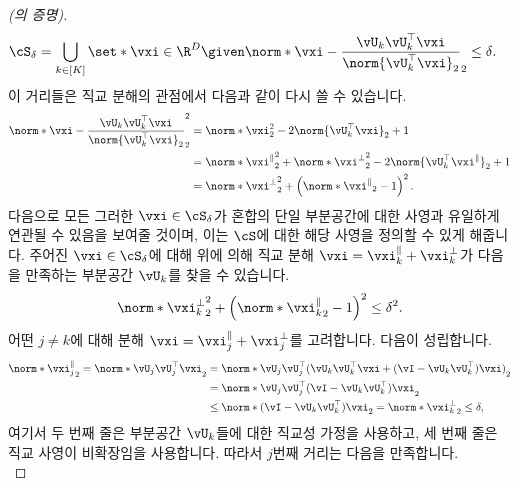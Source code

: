 \documentclass[../../book-main_ko.tex]{subfiles}
\begin{document}
\begin{proof}[(의 증명)]
    \begin{align}
        \cS_{\delta}
        &= \bigcup_{k \in [K]} \set*{\vxi \in \R^D \given
        \norm*{\vxi - \frac{\vU_k\vU_k^\top \vxi}{\norm{\vU_k^\top \vxi}_2}}_2
        \leq \delta}.
    \end{align}
    이 거리들은 직교 분해의 관점에서 다음과 같이 다시 쓸 수 있습니다.
    \begin{align}
        \norm*{\vxi - \frac{\vU_k\vU_k^\top \vxi}{\norm{\vU_k^\top \vxi}_2}}_2^2
        &=
        \norm*{\vxi}_2^2 - 2 \norm{\vU_k^\top \vxi}_2 + 1
        \\
        &=
        \norm*{\vxi^{\|}}_2^2
        + \norm*{\vxi^{\perp}}_2^2
        - 2 \norm{\vU_k^\top \vxi^{\|}}_2 + 1
        \\
        &=
        \norm*{\vxi^{\perp}}_2^2
        + \left( \norm*{\vxi^{\|}}_2 - 1 \right)^2.
        \label{eq:distance-to-hypersphere}
    \end{align}
    다음으로 모든 그러한 \(\vxi \in \cS_{\delta}\)가 혼합의 단일 부분공간에 대한 사영과 유일하게 연관될 수 있음을 보여줄 것이며, 이는 \(\cS\)에 대한 해당 사영을 정의할 수 있게 해줍니다.
    주어진 \(\vxi \in \cS_{\delta}\)에 대해 위에 의해 직교 분해 \(\vxi = \vxi^{\|}_k + \vxi^{\perp}_k\)가 다음을 만족하는 부분공간 \(\vU_k\)를 찾을 수 있습니다.
    \begin{equation}
        \norm*{\vxi^{\perp}_k}_2^2
        + \left( \norm*{\vxi^{\|}_k}_2 - 1 \right)^2
        \leq
        \delta^2.
    \end{equation}
    어떤 \(j \neq k\)에 대해 분해 \(\vxi = \vxi_j^{\|} + \vxi_j^{\perp}\)를 고려합니다. 다음이 성립합니다.
    \begin{align}
        \norm*{\vxi_j^{\|}}_2
        =
        \norm*{
            \vU_j \vU_j^\top \vxi
        }_2
        &=
        \norm*{
            \vU_j \vU_j^\top( \vU_k \vU_k^\top \vxi + (\vI - \vU_k \vU_k^\top)
            \vxi )
        }_2
        \\
        &=
        \norm*{
            \vU_j \vU_j^\top (\vI - \vU_k \vU_k^\top) \vxi
        }_2
        \\
        &\leq
        \norm*{
            (\vI - \vU_k \vU_k^\top) \vxi
        }_2
        =
        \norm*{
            \vxi_k^{\perp}
        }_2
        \leq \delta,
    \end{align}
    여기서 두 번째 줄은 부분공간 \(\vU_k\)들에 대한 직교성 가정을 사용하고, 세 번째 줄은 직교 사영이 비확장임을 사용합니다.
    따라서 \(j\)번째 거리는 다음을 만족합니다.
    \begin{equation}

\end{equation}
\end{proof}
\end{document}
